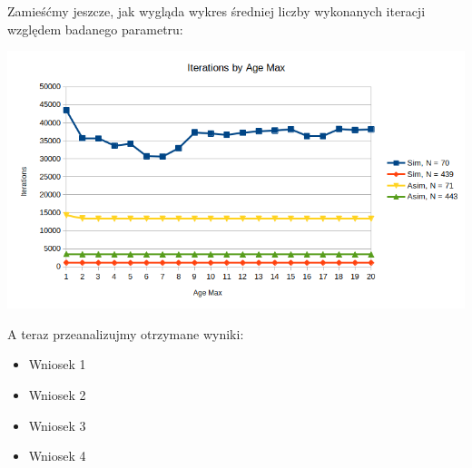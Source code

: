 \documentclass{article}
\begin{document}
Zamieśćmy jeszcze, jak wygląda wykres średniej liczby wykonanych iteracji względem badanego parametru:

\includegraphics[scale=0.72]{ageIter}

A teraz przeanalizujmy otrzymane wyniki:
\begin{itemize}
	\item Wniosek 1
	\item Wniosek 2
	\item Wniosek 3
	\item Wniosek 4
\end{itemize}
\end{document}
